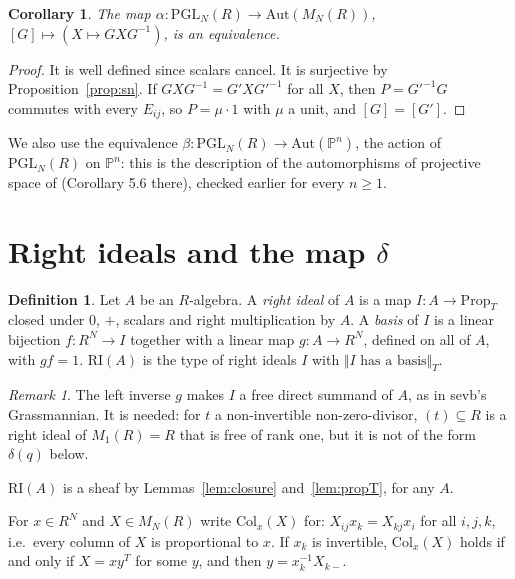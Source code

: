 \documentclass[11pt]{amsart}
\newtheorem{corollary}[theorem]{Corollary}
\theoremstyle{definition}
\newtheorem{definition}[theorem]{Definition}
\theoremstyle{remark}
\newtheorem{remark}[theorem]{Remark}
\newcommand{\Pn}{\mathbb{P}^n}
\newcommand{\M}{M_N(R)}
\newcommand{\RI}{\mathrm{RI}}
\newcommand{\PGL}{\mathrm{PGL}_N(R)}
\newcommand{\Aut}{\mathrm{Aut}}
\newcommand{\trT}[1]{\Vert #1\Vert_T}
\newcommand{\Col}{\mathrm{Col}}
\begin{document}
\begin{corollary}\label{cor:alpha}
The map $\alpha:\PGL\to\Aut(\M)$, $[G]\mapsto(X\mapsto GXG^{-1})$, is an
equivalence.
\end{corollary}
\begin{proof}
It is well defined since scalars cancel. It is surjective by
Proposition~\ref{prop:sn}. If $GXG^{-1}=G'XG'^{-1}$ for all $X$, then
$P=G'^{-1}G$ commutes with every $E_{ij}$, so $P=\mu\cdot1$ with $\mu$ a
unit, and $[G]=[G']$.
\end{proof}

We also use the equivalence $\beta:\PGL\to\Aut(\Pn)$, the action of
$\PGL$ on $\Pn$: this is the description of the automorphisms of projective
space of \cite{Che+24} (Corollary 5.6 there), checked earlier for every
$n\geq1$.

\section{Right ideals and the map $\delta$}

\begin{definition}\label{def:ri}
Let $A$ be an $R$-algebra. A \emph{right ideal} of $A$ is a map
$I:A\to\mathrm{Prop}_T$ closed under $0$, $+$, scalars and right
multiplication by $A$. A \emph{basis} of $I$ is a linear bijection $f:R^N\to
I$ together with a linear map $g:A\to R^N$, defined on all of $A$, with
$gf=1$. $\RI(A)$ is the type of right ideals $I$ with $\trT{I\text{ has a
basis}}$.
\end{definition}

\begin{remark}
The left inverse $g$ makes $I$ a free direct summand of $A$, as in sevb's
Grassmannian. It is needed: for $t$ a non-invertible non-zero-divisor,
$(t)\subseteq R$ is a right ideal of $M_1(R)=R$ that is free of rank one,
but it is not of the form $\delta(q)$ below.
\end{remark}

$\RI(A)$ is a sheaf by Lemmas~\ref{lem:closure} and~\ref{lem:propT}, for any
$A$.

For $x\in R^N$ and $X\in\M$ write $\Col_x(X)$ for: $X_{ij}x_k=X_{kj}x_i$ for
all $i,j,k$, i.e.\ every column of $X$ is proportional to $x$. If $x_k$ is
invertible, $\Col_x(X)$ holds if and only if $X=xy^T$ for some $y$, and
then $y=x_k^{-1}X_{k-}$.
\end{document}
